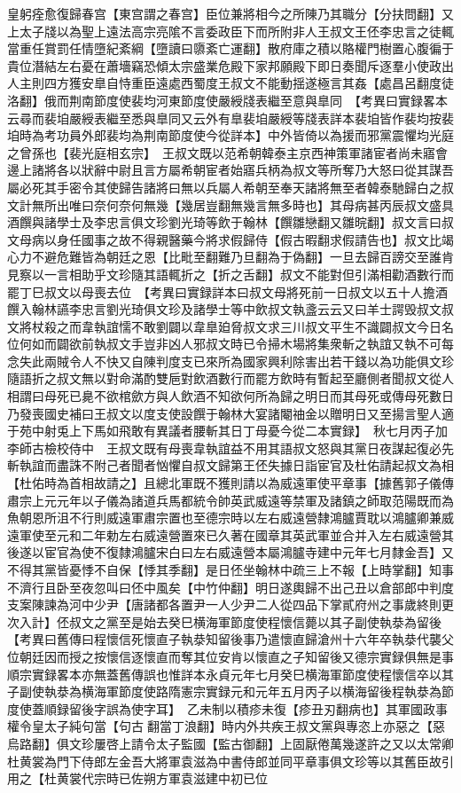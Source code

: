 皇躬痊愈復歸春宫【東宫謂之春宫】臣位兼將相今之所陳乃其職分【分扶問翻】又上太子牋以為聖上遠法高宗亮隂不言委政臣下而所附非人王叔文王伾李忠言之徒輒當重任賞罰任情墮紀紊綱【墮讀曰隳紊亡運翻】散府庫之積以賂權門樹置心腹徧于貴位潛結左右憂在蕭墻竊恐傾太宗盛業危殿下家邦願殿下即日奏聞斥逐羣小使政出人主則四方獲安臯自恃重臣遠處西蜀度王叔文不能動揺遂極言其姦【處昌呂翻度徒洛翻】俄而荆南節度使裴均河東節度使嚴綬牋表繼至意與臯同　【考異曰實録畧本云尋而裴垍嚴綬表繼至悉與臯同又云外有臯裴垍嚴綬等牋表詳本裴垍皆作裴均按裴垍時為考功員外郎裴均為荆南節度使今從詳本】中外皆倚以為援而邪黨震懼均光庭之曾孫也【裴光庭相玄宗】　王叔文既以范希朝韓泰主京西神策軍諸宦者尚未寤會邊上諸將各以狀辭中尉且言方屬希朝宦者始寤兵柄為叔文等所奪乃大怒曰從其謀吾屬必死其手密令其使歸告諸將曰無以兵屬人希朝至奉天諸將無至者韓泰馳歸白之叔文計無所出唯曰奈何奈何無幾【幾居豈翻無幾言無多時也】其母病甚丙辰叔文盛具酒饌與諸學士及李忠言俱文珍劉光琦等飲于翰林【饌雛戀翻又雛晥翻】叔文言曰叔文母病以身任國事之故不得親醫藥今將求假歸侍【假古暇翻求假請告也】叔文比竭心力不避危難皆為朝廷之恩【比毗至翻難乃旦翻為于偽翻】一旦去歸百謗交至誰肯見察以一言相助乎文珍隨其語輒折之【折之舌翻】叔文不能對但引滿相勸酒數行而罷丁巳叔文以母喪去位　【考異曰實録詳本曰叔文母將死前一日叔文以五十人擔酒饌入翰林讌李忠言劉光琦俱文珍及諸學士等中飲叔文執盞云云又曰羊士諤毁叔文叔文將杖殺之而韋執誼懦不敢劉闢以韋臯廹脅叔文求三川叔文平生不識闢叔文今日名位何如而闢欲前執叔文手豈非凶人邪叔文時已令掃木場將集衆斬之執誼又執不可每念失此兩賊令人不快又自陳判度支已來所為國家興利除害出若干錢以為功能俱文珍隨語折之叔文無以對命滿酌雙巵對飲酒數行而罷方飲時有暫起至廳側者聞叔文從人相謂曰母死已臰不欲棺歛方與人飲酒不知欲何所為歸之明日而其母死或傳母死數日乃發喪國史補曰王叔文以度支使設饌于翰林大宴諸閹䄂金以贈明日又至揚言聖人適于苑中射兎上下馬如飛敢有異議者腰斬其日丁母憂今從二本實録】　秋七月丙子加李師古檢校侍中　王叔文既有母喪韋執誼益不用其語叔文怒與其黨日夜謀起復必先斬執誼而盡誅不附己者聞者忷懼自叔文歸第王伾失據日詣宦官及杜佑請起叔文為相【杜佑時為首相故請之】且總北軍既不獲則請以為威遠軍使平章事【據舊郭子儀傳肅宗上元元年以子儀為諸道兵馬都統令帥英武威遠等禁軍及諸鎮之師取范陽既而為魚朝恩所沮不行則威遠軍肅宗置也至德宗時以左右威遠營隸鴻臚賈耽以鴻臚卿兼威遠軍使至元和二年勅左右威遠營置來已久著在國章其英武軍並合并入左右威遠營其後遂以宦官為使不復隸鴻臚宋白曰左右威遠營本屬鴻臚寺建中元年七月隸金吾】又不得其黨皆憂悸不自保【悸其季翻】是日伾坐翰林中疏三上不報【上時掌翻】知事不濟行且卧至夜忽叫曰伾中風矣【中竹仲翻】明日遂輿歸不出己丑以倉部郎中判度支案陳諫為河中少尹【唐諸都各置尹一人少尹二人從四品下掌貳府州之事歲終則更次入計】伾叔文之黨至是始去癸巳横海軍節度使程懷信薨以其子副使執㳟為留後　【考異曰舊傳曰程懷信死懷直子執㳟知留後事乃遣懷直歸滄州十六年卒執㳟代襲父位朝廷因而授之按懷信逐懷直而奪其位安肯以懷直之子知留後又德宗實録俱無是事順宗實録畧本亦無蓋舊傳誤也惟詳本永貞元年七月癸巳横海軍節度使程懷信卒以其子副使執㳟為横海軍節度使路隋憲宗實録元和元年五月丙子以横海留後程執㳟為節度使蓋順録留後字誤為使字耳】　乙未制以積疹未復【疹丑刃翻病也】其軍國政事權令皇太子純句當【句古翻當丁浪翻】時内外共疾王叔文黨與專恣上亦惡之【惡烏路翻】俱文珍屢啓上請令太子監國【監古御翻】上固厭倦萬幾遂許之又以太常卿杜黄裳為門下侍郎左金吾大將軍袁滋為中書侍郎並同平章事俱文珍等以其舊臣故引用之【杜黄裳代宗時已佐朔方軍袁滋建中初已位